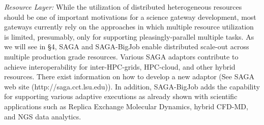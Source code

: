 \documentclass{sig-alternate}
\begin{document}
\textit{Resource Layer:} While the utilization of distributed
heterogeneous resources should be one of important motivations for a
science gateway development, most gateways currently rely on the
approaches in which multiple resource utilization is limited,
presumably, only for supporting pleasingly-parallel multiple tasks.
As we will see in \S4, SAGA and SAGA-BigJob enable distributed
scale-out across multiple production grade resources. Various SAGA
adaptors contribute to achieve interoperability for inter-HPC-grids,
HPC-cloud, and other hybrid resources.  There exist information on how
to develop a new adaptor (See SAGA web site
(http://saga.cct.lsu.edu)). In addition, SAGA-BigJob adds the
capability for supporting various adaptive executions as already shown
with scientific applications such as Replica Exchange Molecular
Dynamics, hybrid CFD-MD, and NGS data
analytics\cite{saga-royalsoc,coupled,ecmls11}.

\end{document}

